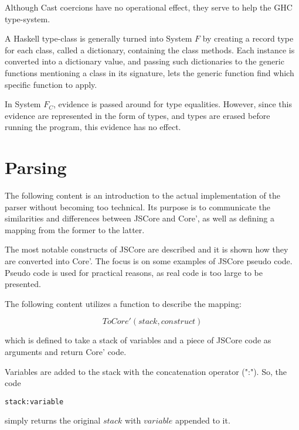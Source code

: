 Although Cast coercions have no operational effect, they serve to help the
GHC type-system.


A Haskell type-class is generally turned into System $F$ by creating a 
record type for each class, called a dictionary, containing the class methods.
Each instance is converted into a dictionary value, and passing such 
dictionaries to the generic functions mentioning a class in its signature,
lets the generic function find which specific function to apply.
\cite{sulzmann2007system}


In System $F_C$, evidence is passed around for type equalities. However,
since this evidence are represented in the form of types, and types are
erased before running the program, this evidence has no effect.
\cite{sulzmann2007system}

\section{Parsing}

The following content is an introduction to the actual implementation
of the parser without becoming too technical. Its purpose is to communicate
the similarities and differences between JSCore 
and Core', as well as defining a mapping from the former to the latter.

The most notable constructs of JSCore are described and it is shown how they
are converted into Core'. The focus is on some examples of JSCore pseudo code.
Pseudo code is used for practical reasons, as real code is too large to be 
presented.

The following content utilizes a function to describe the mapping:

\begin{equation*}
ToCore'(stack, construct)
\end{equation*}

which is defined to take a stack of variables and a piece of JSCore code 
as arguments and return Core' code. 

Variables are added to the stack with the concatenation operator (":"). 
So, the code 
\lstset{ %
language=Haskell,
label=lst:int1
}
\begin{lstlisting}
stack:variable 
\end{lstlisting}
simply returns the original $stack$ with $variable$ appended to it.

